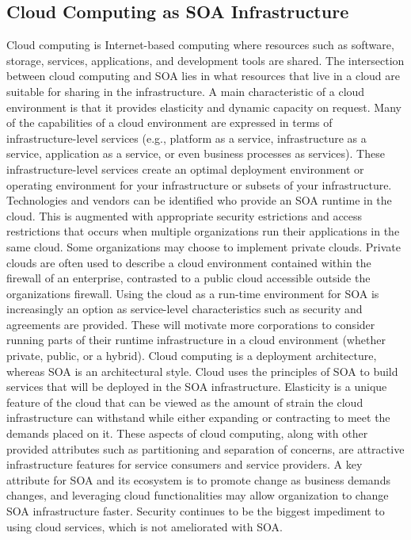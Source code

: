\documentclass[12pt,a4paper,final,twoside,onecolumn,titlepage]{book}
\begin{document}
\subsection{Cloud Computing as SOA Infrastructure}
Cloud computing is Internet-based computing where resources such as software, storage, services, applications, and development tools are shared. The intersection between cloud computing and \gls{SOA} lies in what resources that live in a cloud are suitable for sharing in the infrastructure.
A main characteristic of a cloud environment is that it provides elasticity and dynamic capacity on request. Many of the capabilities of a cloud environment are expressed in terms of infrastructure-level services (e.g., platform as a service, infrastructure as a service, application as a service, or even business processes as services). These infrastructure-level services create an optimal deployment environment or operating environment for your infrastructure or subsets of your infrastructure.
Technologies and vendors can be identified who provide an \gls{SOA} runtime in the cloud. This is augmented with appropriate security
estrictions and access restrictions that occurs when multiple organizations run their applications in the same cloud. Some organizations may choose to implement private clouds. Private clouds are often used to describe a cloud environment contained within the firewall of an enterprise, contrasted to a public cloud accessible outside the organizations firewall.
Using the cloud as a run-time environment for \gls{SOA} is increasingly an option as service-level characteristics such as security and agreements are provided. These will motivate more corporations to consider running parts of their runtime infrastructure in a cloud environment (whether private, public, or a hybrid). Cloud computing is a deployment architecture, whereas \gls{SOA} is an architectural style. Cloud uses the principles of \gls{SOA} to build services that will be deployed in the \gls{SOA} infrastructure. Elasticity is a unique feature of the cloud that can be viewed as the amount of strain the cloud infrastructure can withstand while either expanding or contracting to meet the demands placed on it. These aspects of cloud computing, along with other provided attributes such as partitioning and separation of concerns, are attractive infrastructure features for service consumers and service providers. A key attribute for \gls{SOA} and its ecosystem is to promote change as business demands changes, and leveraging cloud functionalities may allow organization to change \gls{SOA} infrastructure faster. Security continues to be the biggest impediment to using cloud services, which is not ameliorated with \gls{SOA}.
\end{document}

